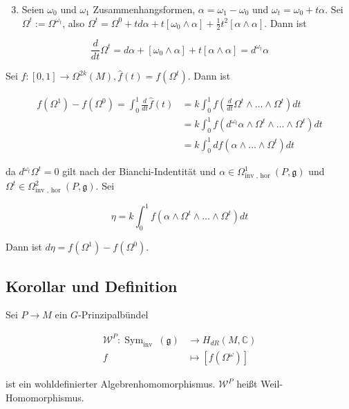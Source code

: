 \documentclass[10pt, letterpaper]{article}
\begin{document}
\begin{enumerate}
  \setcounter{enumi}{2}
  \item Seien $\omega_{0}$ und $\omega_{1}$ Zusammenhangsformen, $\alpha=\omega_{1}-\omega_{0}$ und $\omega_{t}=\omega_{0}+t \alpha$. Sei $\Omega^{t}:=\Omega^{\omega_{t}}$, also $\Omega^{t}=\Omega^{0}+t d \alpha+t\left[\omega_{0} \wedge \alpha\right]+\frac{1}{2} t^{2}[\alpha \wedge \alpha]$. Dann ist
\end{enumerate}

$$
\frac{d}{d t} \Omega^{t}=d \alpha+\left[\omega_{0} \wedge \alpha\right]+t[\alpha \wedge \alpha]=d^{\omega_{t}} \alpha
$$

Sei $\hat{f}:[0,1] \rightarrow \Omega^{2 k}(M), \hat{f}(t)=f\left(\Omega^{t}\right)$. Dann ist

$$
\begin{aligned}
f\left(\Omega^{1}\right)-f\left(\Omega^{0}\right)=\int_{0}^{1} \frac{d}{d t} \hat{f}(t) & =k \int_{0}^{1} f\left(\frac{d}{d t} \Omega^{t} \wedge \ldots \wedge \Omega^{t}\right) d t \\
& =k \int_{0}^{1} f\left(d^{\omega_{t}} \alpha \wedge \Omega^{t} \wedge \ldots \wedge \Omega^{t}\right) d t \\
& =k \int_{0}^{1} d f\left(\alpha \wedge \ldots \wedge \Omega^{t}\right) d t
\end{aligned}
$$

da $d^{\omega_{t}} \Omega^{t}=0$ gilt nach der Bianchi-Indentität und $\alpha \in \Omega_{\text {inv }, \text { hor }}^{1}(P, \mathfrak{g})$ und $\Omega^{t} \in \Omega_{\text {inv }, \text { hor }}^{2}(P, \mathfrak{g})$. Sei

$$
\eta=k \int_{0}^{1} f\left(\alpha \wedge \Omega^{t} \wedge \ldots \wedge \Omega^{t}\right) d t
$$

Dann ist $d \eta=f\left(\Omega^{1}\right)-f\left(\Omega^{0}\right)$.

\subsection*{Korollar und Definition}
Sei $P \rightarrow M$ ein $G$-Prinzipalbündel

$$
\begin{aligned}
\mathcal{W}^{P}: \operatorname{Sym}_{\text {inv }}(\mathfrak{g}) & \rightarrow H_{d R}(M, \mathbb{C}) \\
f & \mapsto\left[f\left(\Omega^{\omega}\right)\right]
\end{aligned}
$$

ist ein wohldefinierter Algebrenhomomorphismus. $\mathcal{W}^{P}$ heißt Weil-Homomorphismus.
\end{document}
